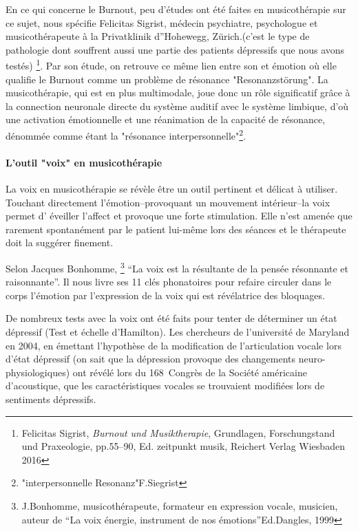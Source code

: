 En ce qui concerne le Burnout,  peu d'études ont été  faites en musicothérapie
sur ce sujet, nous spécifie Felicitas Sigrist, médecin
psychiatre, psychologue et musicothérapeute à la Privatklinik
d''Hohewegg, Zürich.(c'est le type de pathologie dont souffrent aussi 
une partie des patients dépressifs  que nous avons testés) \footnote{Felicitas Sigrist,  
\textit{Burnout und 
		Musiktherapie}, Grundlagen, Forschungstand und Praxeologie, pp.55--90, Ed. 
	zeitpunkt musik, Reichert Verlag Wiesbaden 2016}. Par son étude, on retrouve ce 
	même lien entre son et 
émotion où elle qualifie le Burnout comme un problème de résonance "Resonanzstörung". La 
musicothérapie, qui est en plus multimodale, joue donc un rôle significatif grâce à la 
connection 
neuronale directe du système auditif avec le système limbique, d'où une activation 
émotionnelle et une  réanimation de  la capacité de résonance, dénommée comme 
étant la 
"résonance interpersonnelle"\footnote{"interpersonnelle Resonanz"F.Siegrist}.

\paragraph{L'outil "voix" en musicothérapie}

La voix en musicothérapie se révèle être un outil pertinent et délicat
à utiliser. Touchant 
directement 
l'émotion--provoquant un mouvement intérieur--la voix permet d'
éveiller l'affect
et provoque une forte stimulation. Elle n'est amenée que rarement
spontanément par le patient lui-même lors des séances et le thérapeute doit la suggérer
finement.

Selon Jacques Bonhomme, \footnote{J.Bonhomme, musicothérapeute, formateur 
  	en expression vocale, musicien, auteur de ``La voix énergie,
        instrument de nos émotions''Ed.Dangles, 1999} ``La voix est la
      résultante de la pensée résonnante et raisonnante''.
      Il nous livre ses 11 clés phonatoires pour refaire circuler dans
      le corps 
      l'émotion par l'expression de la voix qui est révélatrice des bloquages.

De nombreux tests avec 
la voix
 ont été faits pour tenter de déterminer un état dépressif 
(Test et échelle d'Hamilton). Les chercheurs de l'université de Maryland en 
2004,
en émettant l'hypothèse de la modification de l'articulation vocale 
lors d'état dépressif (on sait que la dépression provoque des changements  
neuro-physiologiques) ont révélé lors du 168\ieme\ Congrès de la Société
américaine d'acoustique, que les caractéristiques 
vocales se trouvaient modifiées lors de sentiments 
dépressifs\autocite{le_service_metronews}.

